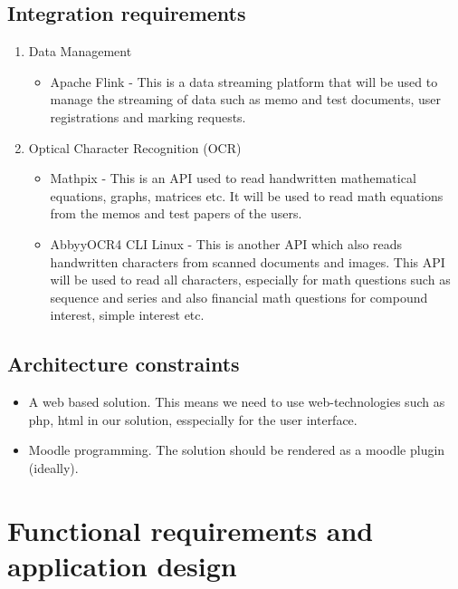 \documentclass{article}
\begin{document}
	\subsection{Integration requirements}
	\begin{enumerate}
		\item Data Management
		\begin{itemize}
			\item Apache Flink - This is a data streaming platform that will be used to manage the streaming of data such as memo and test documents, user registrations and marking requests.
		\end{itemize}
		\item Optical Character Recognition (OCR)
		\begin{itemize}
			\item Mathpix - This is an API used to read handwritten mathematical equations, graphs, matrices etc. It will be used to read math equations from the memos and test papers of the users.
			\item AbbyyOCR4 CLI Linux - This is another API which also reads handwritten characters from scanned documents and images. This API will be used to read all characters, especially for math questions such as sequence and series and also financial math questions for compound interest, simple interest etc.
		\end{itemize}
	\end{enumerate}
	\subsection{Architecture constraints}	
	\begin{itemize}
		\item A web based solution. This means we need to use web-technologies such as php, html in our solution, esspecially for the user interface.
		\item Moodle programming. The solution should be rendered as a moodle plugin (ideally).
	\end{itemize}
\section{Functional requirements and application design}
\end{document}
